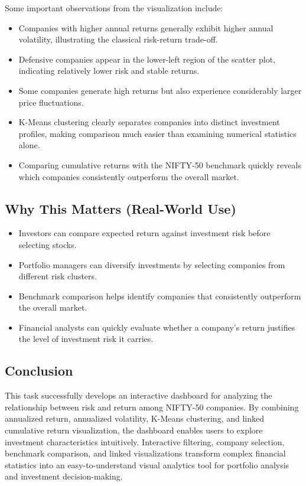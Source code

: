 \documentclass[14pt,a4paper]{extreport}
\begin{document}
Some important observations from the visualization include:

\begin{itemize}
    \item Companies with higher annual returns generally exhibit higher
        annual volatility, illustrating the classical risk-return
        trade-off.
    \item Defensive companies appear in the lower-left region of the
        scatter plot, indicating relatively lower risk and stable returns.
    \item Some companies generate high returns but also experience
        considerably larger price fluctuations.
    \item K-Means clustering clearly separates companies into distinct
        investment profiles, making comparison much easier than examining
        numerical statistics alone.
    \item Comparing cumulative returns with the NIFTY-50 benchmark
        quickly reveals which companies consistently outperform the
        overall market.
\end{itemize}

\subsection{Why This Matters (Real-World Use)}
\begin{itemize}
    \item Investors can compare expected return against investment risk
        before selecting stocks.
    \item Portfolio managers can diversify investments by selecting
        companies from different risk clusters.
    \item Benchmark comparison helps identify companies that consistently
        outperform the overall market.
    \item Financial analysts can quickly evaluate whether a company's
        return justifies the level of investment risk it carries.
\end{itemize}

\subsection{Conclusion}
This task successfully develops an interactive dashboard for analyzing
the relationship between risk and return among NIFTY-50 companies. By
combining annualized return, annualized volatility, K-Means clustering,
and linked cumulative return visualization, the dashboard enables users
to explore investment characteristics intuitively. Interactive filtering,
company selection, benchmark comparison, and linked visualizations
transform complex financial statistics into an easy-to-understand visual
analytics tool for portfolio analysis and investment decision-making.
\end{document}
